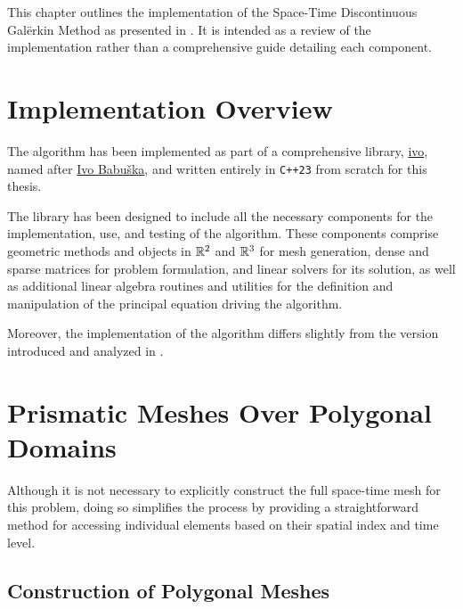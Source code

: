 This chapter outlines the implementation of the Space-Time Discontinuous Galërkin Method as presented in . It is intended as a review of the implementation rather than a comprehensive guide detailing each component.

\section{Implementation Overview}

The algorithm has been implemented as part of a comprehensive library, \href{https://github.com/diantonioandrea/ivo}{ivo}, named after \href{https://en.wikipedia.org/wiki/Ivo_Babuška}{Ivo Babuška}, and written entirely in \lstinline{C++23} from scratch for this thesis.

The library has been designed to include all the necessary components for the implementation, use, and testing of the algorithm. These components comprise geometric methods and objects in $\mathbb{R}^{2}$ and $\mathbb{R}^{3}$ for mesh generation, dense and sparse matrices for problem formulation, and linear solvers for its solution, as well as additional linear algebra routines and utilities for the definition and manipulation of the principal equation driving the algorithm.

Moreover, the implementation of the algorithm differs slightly from the version introduced and analyzed in .

\newpage
\section{Prismatic Meshes Over Polygonal Domains} \label{section:mesh}

Although it is not necessary to explicitly construct the full space-time mesh for this problem, doing so simplifies the process by providing a straightforward method for accessing individual elements based on their spatial index and time level. 

\subsection{Construction of Polygonal Meshes} \label{subsection:pol_mesh}

%         
%         

